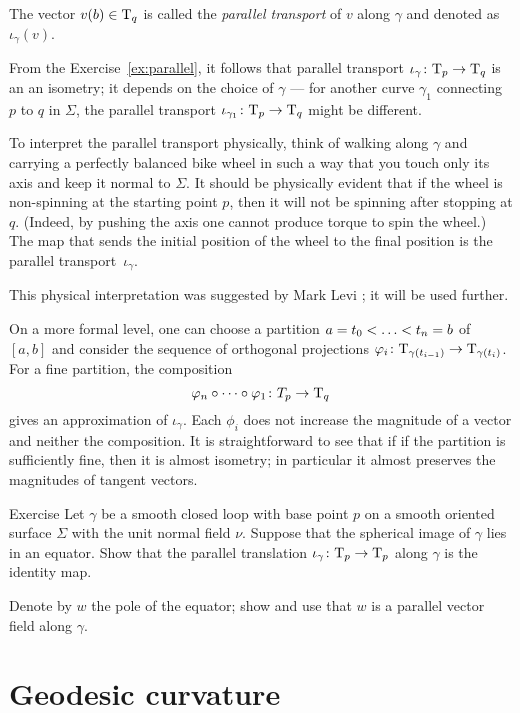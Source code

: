 The vector $v(b)\in\mathrm{T}_q$ is called the \emph{parallel transport} of $v$ along $\gamma$ and denoted as $\iota_\gamma(v)$.

From the Exercise~\ref{ex:parallel}, it follows that parallel transport $\iota_\gamma\:\T_p\z\to\T_q$ is an an isometry;
it depends on the choice of $\gamma$ --- for another curve $\gamma_1$ connecting $p$ to $q$ in $\Sigma$, the parallel transport $\iota_{\gamma_1}\colon\mathrm{T}_p\to\mathrm{T}_q$ might be different.

To interpret the parallel transport physically, 
think of walking along $\gamma$ and carrying a perfectly balanced bike wheel in such a way that you touch only its axis and keep it normal to $\Sigma$.
It should be physically evident that if the wheel is non-spinning at the starting point $p$, then it will not be spinning after stopping at $q$.
(Indeed, by pushing the axis one cannot produce torque to spin the wheel.)
The map that sends the initial position of the wheel to the final position is  the parallel transport~$\iota_\gamma$.

This physical interpretation was suggested by Mark Levi \cite{levi};
it will be used further.

On a more formal level, one can choose a partition $a=t_0<\dots\z<t_n=b$ of $[a,b]$
and consider the sequence of orthogonal projections $\varphi_i\colon\mathrm{T}_{\gamma(t_{i-1})}\to\mathrm{T}_{\gamma(t_i)}$.
For a fine partition, the composition 
\[\phi_n\circ\dots\circ\phi_1\:T_p\z\to\T_q\]
gives an approximation of $\iota_\gamma$.
Each $\phi_i$ does not increase the magnitude of a vector and neither the composition.
It is straightforward to see that if if the partition is sufficiently fine, then it is almost isometry; in particular it almost preserves the magnitudes of tangent vectors.

\begin{thm}{Exercise}
Let $\gamma$ be a smooth closed loop with base point $p$ on a smooth oriented surface $\Sigma$ with the unit normal field $\nu$.
Suppose that the spherical image of $\gamma$ lies in an equator.
Show that the parallel translation $\iota_\gamma\colon\mathrm{T}_p\to \mathrm{T}_p$ along $\gamma$ is the identity map.
\end{thm}

 Denote by $w$ the pole of the equator; show and use that $w$ is a parallel vector field along $\gamma$.

\section*{Geodesic curvature}

